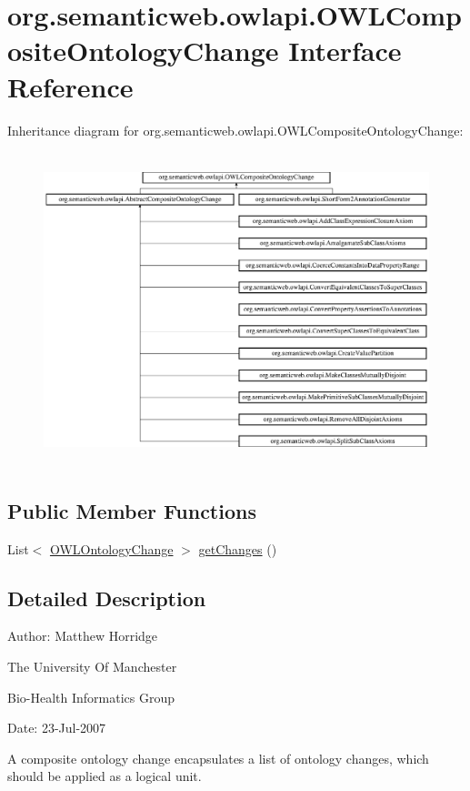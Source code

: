 \hypertarget{interfaceorg_1_1semanticweb_1_1owlapi_1_1_o_w_l_composite_ontology_change}{\section{org.\-semanticweb.\-owlapi.\-O\-W\-L\-Composite\-Ontology\-Change Interface Reference}
\label{interfaceorg_1_1semanticweb_1_1owlapi_1_1_o_w_l_composite_ontology_change}
}
Inheritance diagram for org.\-semanticweb.\-owlapi.\-O\-W\-L\-Composite\-Ontology\-Change\-:\begin{figure}[H]
\begin{center}
\leavevmode
\includegraphics[height=9.145729cm]{interfaceorg_1_1semanticweb_1_1owlapi_1_1_o_w_l_composite_ontology_change}
\end{center}
\end{figure}
\subsection*{Public Member Functions}
\begin{DoxyCompactItemize}
\item 
List$<$ \hyperlink{classorg_1_1semanticweb_1_1owlapi_1_1model_1_1_o_w_l_ontology_change}{O\-W\-L\-Ontology\-Change} $>$ \hyperlink{interfaceorg_1_1semanticweb_1_1owlapi_1_1_o_w_l_composite_ontology_change_a047d3f540ac840c0ac0285bc576636d2}{get\-Changes} ()
\end{DoxyCompactItemize}


\subsection{Detailed Description}
Author\-: Matthew Horridge\par
 The University Of Manchester\par
 Bio-\/\-Health Informatics Group\par
 Date\-: 23-\/\-Jul-\/2007\par
\par
 A composite ontology change encapsulates a list of ontology changes, which should be applied as a logical unit. 

